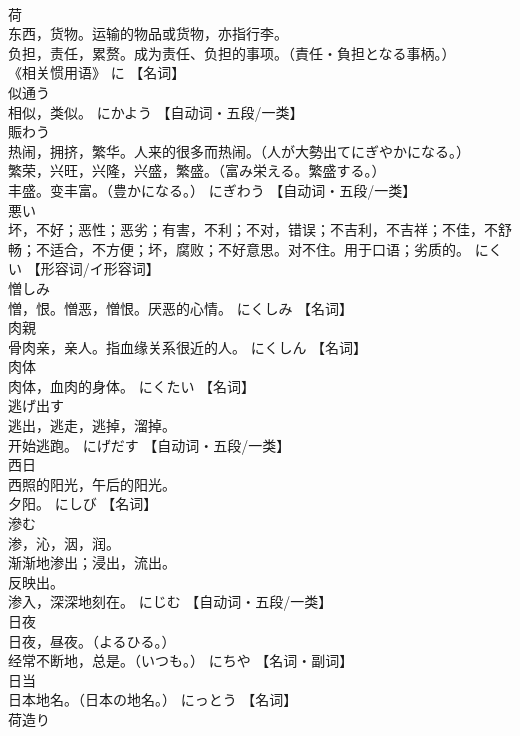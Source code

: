\documentclass[8pt]{extreport}
\begin{document}
\begin{CJK}{UTF8}{min}
\\	荷	
\\	东西，货物。运输的物品或货物，亦指行李。 
\\	负担，责任，累赘。成为责任、负担的事项。（責任・負担となる事柄。） 
\\	《相关惯用语》	に		【名词】
\\	似通う	
\\	相似，类似。	にかよう		【自动词・五段/一类】
\\	賑わう	
\\	热闹，拥挤，繁华。人来的很多而热闹。（人が大勢出てにぎやかになる。） 
\\	繁荣，兴旺，兴隆，兴盛，繁盛。（富み栄える。繁盛する。） 
\\	丰盛。变丰富。（豊かになる。）	にぎわう		【自动词・五段/一类】
\\	悪い	
\\	坏，不好；恶性；恶劣；有害，不利；不对，错误；不吉利，不吉祥；不佳，不舒畅；不适合，不方便；坏，腐败；不好意思。对不住。用于口语；劣质的。	にくい		【形容词/イ形容词】
\\	憎しみ	
\\	憎，恨。憎恶，憎恨。厌恶的心情。	にくしみ		【名词】
\\	肉親	
\\	骨肉亲，亲人。指血缘关系很近的人。	にくしん		【名词】
\\	肉体	
\\	肉体，血肉的身体。	にくたい		【名词】
\\	逃げ出す	
\\	逃出，逃走，逃掉，溜掉。 
\\	开始逃跑。	にげだす		【自动词・五段/一类】
\\	西日	
\\	西照的阳光，午后的阳光。 
\\	夕阳。	にしび		【名词】
\\	滲む	
\\	渗，沁，洇，润。 
\\	渐渐地渗出；浸出，流出。 
\\	反映出。 
\\	渗入，深深地刻在。	にじむ		【自动词・五段/一类】
\\	日夜	
\\	日夜，昼夜。（よるひる。） 
\\	经常不断地，总是。（いつも。）	にちや		【名词・副词】
\\	日当	
\\	日本地名。（日本の地名。）	にっとう		【名词】
\\	荷造り	

\end{CJK}
\end{document}
